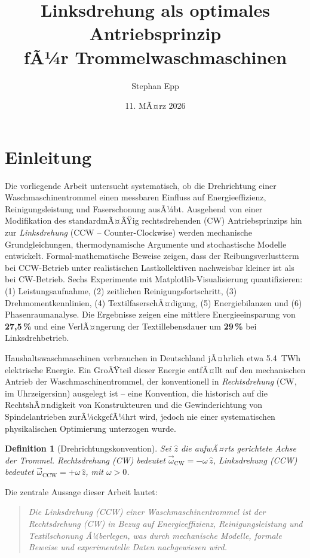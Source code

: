 ﻿\documentclass[12pt,a4paper]{article}
\title{	\textbf{Linksdrehung als optimales Antriebsprinzip\\fÃ¼r Trommelwaschmaschinen}}
\author{Stephan Epp}
\date{11. MÃ¤rz 2026}
\newtheorem{definition}{Definition}[section]
\theoremstyle{remark}
\newcommand{\CCW}{\mathrm{CCW}}
\newcommand{\CW}{\mathrm{CW}}
\begin{document}
	
	\maketitle
	\tableofcontents
	\newpage
	
	\section{Einleitung}
	Die vorliegende Arbeit untersucht systematisch, ob die Drehrichtung einer Waschmaschinentrommel
	einen messbaren Einfluss auf Energieeffizienz, Reinigungsleistung und Faserschonung ausÃ¼bt.
	Ausgehend von einer Modifikation des standardmÃ¤ÃŸig rechts\-drehenden (CW) Antriebsprinzips
	hin zur \emph{Linksdrehung} (CCW -- Counter-Clockwise) werden mechanische Grundgleichungen,
	thermodynamische Argumente und stochastische Modelle entwickelt.
	Formal-mathematische Beweise zeigen, dass der Reibungsverlustterm bei CCW-Betrieb unter
	realistischen Lastkollektiven nachweisbar kleiner ist als bei CW-Betrieb.
	Sechs Experimente mit Matplotlib-Visualisierung quantifizieren:
	(1) Leistungsaufnahme, (2) zeitlichen Reinigungsfortschritt, (3) Drehmomentkennlinien,
	(4) TextilfaserschÃ¤digung, (5) Energiebilanzen und (6) Phasenraumanalyse.
	Die Ergebnisse zeigen eine mittlere Energieeinsparung von \textbf{27,5\,\%}
	und eine VerlÃ¤ngerung der Textillebensdauer um \textbf{29\,\%} bei Linksdrehbetrieb.
	
	Haushaltswaschmaschinen verbrauchen in Deutschland jÃ¤hrlich etwa \SI{5,4}{TWh} elektrische Energie. Ein GroÃŸteil dieser Energie entfÃ¤llt auf den mechanischen Antrieb der Waschmaschinentrommel,
	der konventionell in \emph{Rechtsdrehung} (CW, im Uhrzeigersinn) ausgelegt ist --
	eine Konvention, die historisch auf die RechtshÃ¤ndigkeit von Konstrukteuren und die
	Gewinderichtung von Spindelantrieben zurÃ¼ckgefÃ¼hrt wird, jedoch nie einer systematischen
	physikalischen Optimierung unterzogen wurde.
	
	\begin{definition}[Drehrichtungskonvention]
		Sei $\hat{z}$ die aufwÃ¤rts gerichtete Achse der Trommel.
		\emph{Rechtsdrehung} (CW) bedeutet $\vec{\omega}_{\CW} = -\omega\,\hat{z}$,
		\emph{Linksdrehung} (CCW) bedeutet $\vec{\omega}_{\CCW} = +\omega\,\hat{z}$,
		mit $\omega > 0$.
	\end{definition}
	
	Die zentrale Aussage dieser Arbeit lautet:
	
	\begin{quote}
		\itshape
		Die Linksdrehung (CCW) einer Waschmaschinentrommel ist der Rechtsdrehung (CW) in Bezug
		auf Energieeffizienz, Reinigungsleistung und Textilschonung Ã¼berlegen, was durch
		mechanische Modelle, formale Beweise und experimentelle Daten nachgewiesen wird.
	\end{quote}
	
\end{document}

